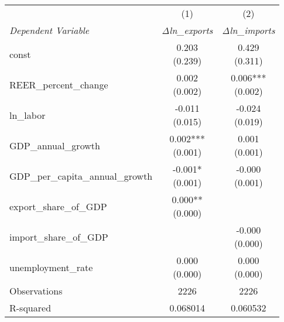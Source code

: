 \begin{tabular}{lcc}
\toprule
 & (1) & (2) \\
\textit{Dependent Variable} & \textit{Δln\_exports} & \textit{Δln\_imports} \\ 
\midrule

const & \makecell{0.203 \\ (0.239)} & \makecell{0.429 \\ (0.311)} \\
REER\_percent\_change & \makecell{0.002 \\ (0.002)} & \makecell{0.006*** \\ (0.002)} \\
ln\_labor & \makecell{-0.011 \\ (0.015)} & \makecell{-0.024 \\ (0.019)} \\
GDP\_annual\_growth & \makecell{0.002*** \\ (0.001)} & \makecell{0.001 \\ (0.001)} \\
GDP\_per\_capita\_annual\_growth & \makecell{-0.001* \\ (0.001)} & \makecell{-0.000 \\ (0.001)} \\
export\_share\_of\_GDP & \makecell{0.000** \\ (0.000)} &  \\
import\_share\_of\_GDP &  & \makecell{-0.000 \\ (0.000)} \\
unemployment\_rate & \makecell{0.000 \\ (0.000)} & \makecell{0.000 \\ (0.000)} \\
Observations & 2226 & 2226 \\
R-squared & 0.068014 & 0.060532 \\
\bottomrule
\end{tabular}
